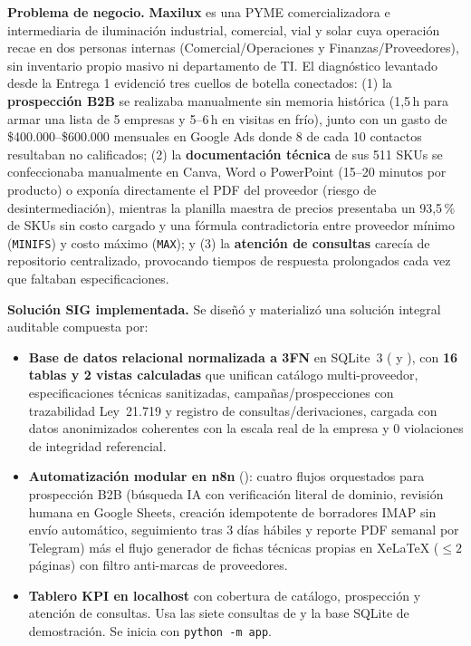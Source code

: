 \documentclass{article}
\begin{document}
\textbf{Problema de negocio.} \textbf{Maxilux} es una PYME comercializadora e intermediaria de iluminación industrial, comercial, vial y solar cuya operación recae en dos personas internas (Comercial/Operaciones y Finanzas/Proveedores), sin inventario propio masivo ni departamento de TI. El diagnóstico levantado desde la Entrega 1 evidenció tres cuellos de botella conectados: (1) la \textbf{prospección B2B} se realizaba manualmente sin memoria histórica (1,5\,h para armar una lista de 5 empresas y 5--6\,h en visitas en frío), junto con un gasto de \$400.000--\$600.000 mensuales en Google Ads donde 8 de cada 10 contactos resultaban no calificados; (2) la \textbf{documentación técnica} de sus 511 SKUs se confeccionaba manualmente en Canva, Word o PowerPoint (15--20 minutos por producto) o exponía directamente el PDF del proveedor (riesgo de desintermediación), mientras la planilla maestra de precios presentaba un 93,5\,\% de SKUs sin costo cargado y una fórmula contradictoria entre proveedor mínimo (\texttt{MINIFS}) y costo máximo (\texttt{MAX}); y (3) la \textbf{atención de consultas} carecía de repositorio centralizado, provocando tiempos de respuesta prolongados cada vez que faltaban especificaciones.

\textbf{Solución SIG implementada.} Se diseñó y materializó una solución integral auditable compuesta por:
\begin{itemize}
    \item \textbf{Base de datos relacional normalizada a 3FN} en SQLite~3 ( y ), con \textbf{16 tablas y 2 vistas calculadas} que unifican catálogo multi-proveedor, especificaciones técnicas sanitizadas, campañas/prospecciones con trazabilidad Ley~21.719 y registro de consultas/derivaciones, cargada con datos anonimizados coherentes con la escala real de la empresa y 0 violaciones de integridad referencial.
    \item \textbf{Automatización modular en n8n} (): cuatro flujos orquestados para prospección B2B (búsqueda IA con verificación literal de dominio, revisión humana en Google Sheets, creación idempotente de borradores IMAP sin envío automático, seguimiento tras 3 días hábiles y reporte PDF semanal por Telegram) más el flujo generador de fichas técnicas propias en XeLaTeX ($\le 2$ páginas) con filtro anti-marcas de proveedores.
    \item \textbf{Tablero KPI en localhost} con cobertura de catálogo, prospección y atención de consultas. Usa las siete consultas de  y la base SQLite de demostración. Se inicia con \texttt{python -m app}.
\end{itemize}
\end{document}
